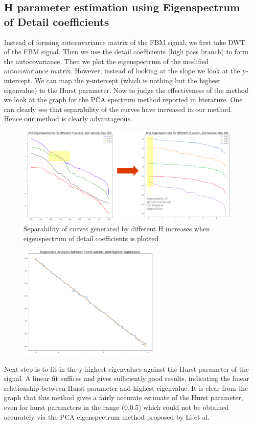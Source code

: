 \documentclass[a4paper]{article}
\begin{document}
\subsection{H parameter estimation using Eigenspectrum of Detail coefficients}
Instead of forming autocovariance matrix of the FBM signal, we first take DWT of the FBM signal. Then we use the detail coefficients (high pass branch) to form the autocovariance. Then we plot the eigenspectrum of the modified autocovariance matrix. However, instead of looking at the slope we look at the y-intercept. We can map the y-intercept (which is nothing but the highest eigenvalue) to the Hurst parameter.
Now to judge the effectiveness of the method we look at the graph for the PCA spectrum method reported in literature. One can clearly see that separability of the curves have increased in our method. Hence our method is clearly advantageous.

\begin{figure}[H]
\includegraphics[width=\textwidth]{dwt_1.png}
\caption{Separability of curves generated by different H increases when eigenspectrum of detail coefficients is plotted}
\end{figure}

\begin{figure}
\vspace{-15pt}
\includegraphics[width=7cm]{dwt_lin.png}
\vspace{-30pt}
\end{figure} 
Next step is to fit in the y highest eigenvalues against the Hurst parameter of the signal. A linear fit suffices and gives sufficiently good results, indicating the linear relationship between Hurst parameter and highest eigenvalue.  It is clear from the graph that this method gives a fairly accurate estimate of the Hurst parameter, even for hurst parameters in the range (0,0.5) which could not be obtained accurately via the PCA eigenspectrum method proposed by Li et al.
\\
\end{document}
